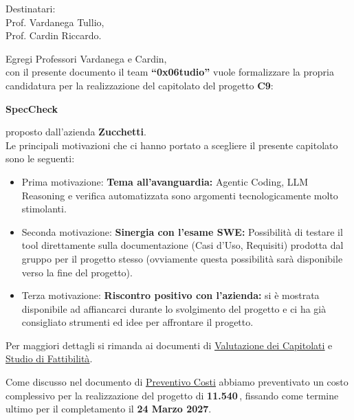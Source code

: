 \documentclass[a4paper, 11pt]{article}
\newcommand{\gruppo}{0x06tudio}
\newcommand{\codicecapitolato}{C9}
\newcommand{\nomecapitolato}{SpecCheck}
\newcommand{\azienda}{Zucchetti}
\newcommand{\costo}{11.540\,\texteuro}
\newcommand{\scadenza}{24 Marzo 2027}
\newcommand{\linksott}[2]{\href{#1}{\uline{#2}}}
\newcommand{\urlvalutazione}{https://raw.githubusercontent.com/0x06tudio/docs/main/out/candidatura/resoconto_capitolati.pdf}
\newcommand{\urlpreventivo}{https://raw.githubusercontent.com/0x06tudio/docs/main/out/candidatura/preventivo_costi_e_impegni_orari.pdf}
\newcommand{\urlfattibilita}{https://raw.githubusercontent.com/0x06tudio/docs/main/out/candidatura/studio_di_fattibilita.pdf}
\begin{document}
\vspace{0.5cm}

\noindent Destinatari:\\
Prof. Vardanega Tullio,\\
Prof. Cardin Riccardo.

\vspace{0.5cm}

\noindent Egregi Professori Vardanega e Cardin,\\
con il presente documento il team \textbf{``\gruppo''} vuole formalizzare la propria candidatura per la realizzazione del capitolato del progetto \textbf{\codicecapitolato}:

\begin{center}
    \textbf{\nomecapitolato}
\end{center}

\noindent proposto dall'azienda \textbf{\azienda}.\\
Le principali motivazioni che ci hanno portato a scegliere il presente capitolato sono le seguenti:

\begin{itemize}
    \item Prima motivazione: \textbf{Tema all'avanguardia:} Agentic Coding, LLM Reasoning e verifica automatizzata sono argomenti tecnologicamente molto stimolanti. 
    \item Seconda motivazione: \textbf{Sinergia con l'esame SWE:} Possibilità di testare il tool direttamente sulla documentazione (Casi d'Uso, Requisiti) prodotta dal gruppo per il progetto stesso (ovviamente questa possibilità sarà disponibile verso la fine del progetto).
    \item Terza motivazione: \textbf{Riscontro positivo con l'azienda:} si è mostrata disponibile ad affiancarci durante lo svolgimento del progetto e ci ha già consigliato strumenti ed idee per affrontare il progetto.
\end{itemize}

\noindent Per maggiori dettagli si rimanda ai documenti di \linksott{\urlvalutazione}{Valutazione dei Capitolati} e \linksott{\urlfattibilita}{Studio di Fattibilità}.

\vspace{0.3cm}

\noindent Come discusso nel documento di \linksott{\urlpreventivo}{Preventivo Costi} abbiamo preventivato un costo complessivo per la realizzazione del progetto di \textbf{\costo}, fissando come termine ultimo per il completamento il \textbf{\scadenza}.
\end{document}
